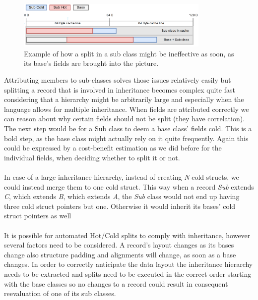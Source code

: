 \begin{figure}[!htbp]
	\centering
	\includegraphics[width=0.83\textwidth,height=0.25\textwidth]{PICs/inheritance_split_2}
	\caption{Example of how a split in a sub class might be ineffective as soon, as its base's fields are brought into the picture.}
	\label{inheritance_split_2}
\end{figure}
Attributing members to sub-classes solves those issues relatively easily but splitting a record that is involved in inheritance becomes complex quite fast considering that a hierarchy might be arbitrarily large and especially when the language allows for multiple inheritance. When fields are attributed correctly we can reason about why certain fields should not be split (they have correlation). The next step would be for a Sub class to deem a base class' fields cold. This is a bold step, as the base class might actually rely on it quite frequently. Again this could be expressed by a cost-benefit estimation as we did before for the individual fields, when deciding whether to split it or not.\\\\
In case of a large inheritance hierarchy, instead of creating \textit{N} cold structs, we could instead merge them to one cold struct. This way when a record \textit{Sub} extends \textit{C}, which extends \textit{B}, which extends \textit{A}, the \textit{Sub} class would not end up having three cold struct pointers but one. Otherwise it would inherit its bases' cold struct pointers as well\\\\
It is possible for automated Hot/Cold splits to comply with inheritance, however several factors need to be considered. A record's layout changes as its bases change also structure padding and alignments will change, as soon as a base changes. In order to correctly anticipate the data layout the inheritance hierarchy needs to be extracted and splits need to be executed in the correct order starting with the base classes so no changes to a record could result in consequent reevaluation of one of its sub classes.

